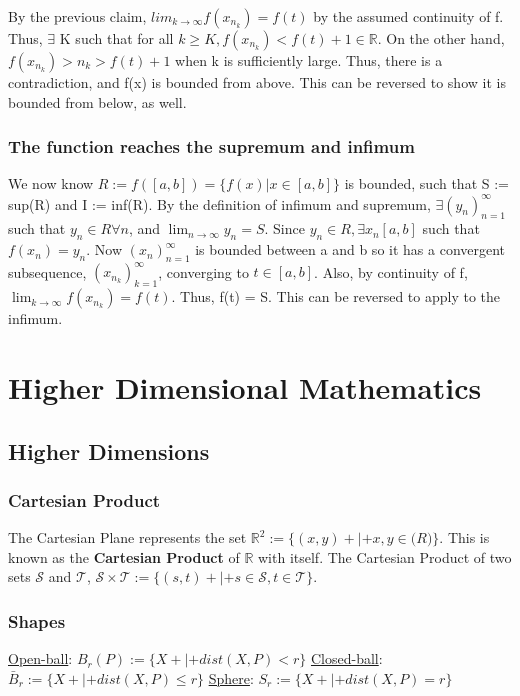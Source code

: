 \documentclass[11 pt, twoside]{article}
\begin{document}
By the previous claim, $lim_{k \to \infty}f(x_{n_k}) = f(t)$ by the assumed continuity of f. Thus, $\exists$ K such that for all $k \geq K, f(x_{n_k}) < f(t) + 1 \in \mathbb{R}$. On the other hand, $f(x_{n_k}) > n_k > f(t) + 1$ when k is sufficiently large. Thus, there is a contradiction, and f(x) is bounded from above. This can be reversed to show it is bounded from below, as well.

\subsubsection{The function reaches the supremum and infimum}
We now know $R := f([a, b]) = \{f(x) | x \in [a, b]\}$ is bounded, such that S := sup(R) and I := inf(R). By the definition of infimum and supremum, $\exists (y_n)^\infty_{n = 1}$ such that $y_n \in R \forall n$, and $\lim_{n \to \infty}y_n = S$. Since $y_n \in R, \exists x_n [a, b]$ such that $f(x_n) = y_n$. Now $(x_n)^\infty_{n=1}$ is bounded between a and b so it has a convergent subsequence, $(x_{n_k})^\infty_{k=1}$, converging to $t \in [a, b]$. Also, by continuity of f, $\lim_{k \to \infty}f(x_{n_k}) = f(t)$. Thus, f(t) = S. This can be reversed to apply to the infimum. 

\section{Higher Dimensional Mathematics}

\subsection{Higher Dimensions}
\subsubsection{Cartesian Product}
The Cartesian Plane represents the set $\mathbb{R}^2 := \{(x, y)+|+x, y\in \mathbb(R)\}$. This is known as the \textbf{Cartesian Product} of $\mathbb{R}$ with
itself. The Cartesian Product of two sets $\mathcal{S}$ and $\mathcal{T}$,
$\mathcal{S} \times \mathcal{T} :=  \{(s, t)+|+s\in\mathcal{S},
t\in\mathcal{T}\}$.

\subsubsection{Shapes}
\underline{Open-ball}:
$B_r(P) := \{X+|+dist(X, P) < r\}$
\underline{Closed-ball}:
$\bar{B}_r := \{X+|+ dist(X, P) \leq r\}$
\underline{Sphere}:
$S_r := \{X+|+dist(X, P) = r\}$
\end{document}
